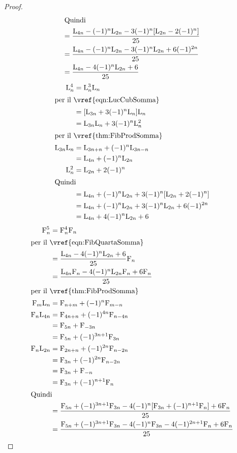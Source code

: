 \begin{proof}
\begin{align*}
\intertext{Quindi}
={}&\dfrac{\mathrm{L}_{4n}-(-1)^n\mathrm{L}_{2n}-3(-1)^n[\mathrm{L}_{2n}-2(-1)^n]}{25}\\
={}&\dfrac{\mathrm{L}_{4n}-(-1)^n\mathrm{L}_{2n}-3(-1)^n\mathrm{L}_{2n}+6(-1)^{2n}}{25}\\
={}&\dfrac{\mathrm{L}_{4n}-4(-1)^n\mathrm{L}_{2n}+6}{25}\\
\end{align*}
\begin{align*}
\Luc{n}^4={}&\Luc{n}^3\Luc{n}\\
\intertext{per il~\vref{eqn:LucCubSomma}}
={}&[\Luc{3n}+3(-1)^n\Luc{n}]\Luc{n}\\
={}&\Luc{3n}\Luc{n}+3(-1)^n\Luc{n}^2\\
\intertext{per il~\vref{thm:FibProdSomma}}
\Luc{3n}\Luc{n}={}&\Luc{3n+n}+(-1)^n\Luc{3n-n}\\
={}&\Luc{4n}+(-1)^n\Luc{2n}\\
\Luc{n}^2={}&\Luc{2n}+2(-1)^n\\
\intertext{Quindi}
={}&\Luc{4n}+(-1)^n\Luc{2n}+3(-1)^n[\Luc{2n}+2(-1)^n]\\
={}&\Luc{4n}+(-1)^n\Luc{2n}+3(-1)^n\Luc{2n}+6(-1)^{2n}\\
={}&\Luc{4n}+4(-1)^n\Luc{2n}+6\\
\end{align*}
\begin{align*}
	\Fib{n}^5={}&\Fib{n}^4\Fib{n}\\
	\intertext{per il~\vref{eqn:FibQuartaSomma}}
	={}&\dfrac{\Luc{4n}-4(-1)^n\Luc{2n}+6}{25}\Fib{n}\\
	={}&\dfrac{\Luc{4n}\Fib{n}-4(-1)^n\Luc{2n}\Fib{n}+6\Fib{n}}{25}\\
	\intertext{per il~\vref{thm:FibProdSomma}}
	\Fib{m}\Luc{n}={}&\Fib{n+m}+(-1)^n\Fib{m-n}\\
	\Fib{n}\Luc{4n}={}&\Fib{4n+n}+(-1)^{4n}\Fib{n-4n}\\
	={}&\Fib{5n}+\Fib{-3n}\\
	={}&\Fib{5n}+(-1)^{3n+1}\Fib{3n}\\
	\Fib{n}\Luc{2n}={}&\Fib{2n+n}+(-1)^{2n}\Fib{n-2n}\\
	={}&\Fib{3n}+(-1)^{2n}\Fib{n-2n}\\
	={}&\Fib{3n}+\Fib{-n}\\
	={}&\Fib{3n}+(-1)^{n+1}\Fib{n}\\
	\intertext{Quindi}
	={}&\dfrac{\Fib{5n}+(-1)^{3n+1}\Fib{3n}-4(-1)^n[\Fib{3n}+(-1)^{n+1}\Fib{n}]+6\Fib{n}}{25}\\
	={}&\dfrac{\Fib{5n}+(-1)^{3n+1}\Fib{3n}-4(-1)^n\Fib{3n}-4(-1)^{2n+1}\Fib{n}+6\Fib{n}}{25}\\

\end{align*}
\end{proof}
